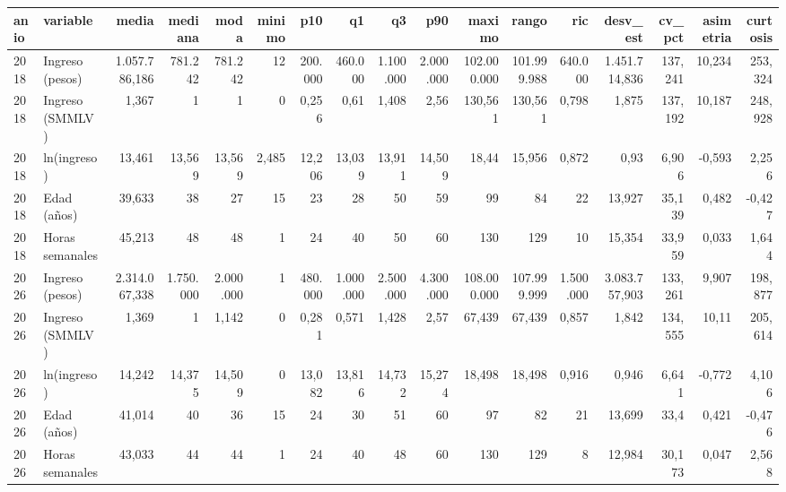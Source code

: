 \begin{tabular}{llrrrrrrrrrrrrrrr}
\toprule
anio & variable & media & mediana & moda & minimo & p10 & q1 & q3 & p90 & maximo & rango & ric & desv\_est & cv\_pct & asimetria & curtosis \\
\midrule
2018 & Ingreso (pesos) & 1.057.786,186 & 781.242 & 781.242 & 12 & 200.000 & 460.000 & 1.100.000 & 2.000.000 & 102.000.000 & 101.999.988 & 640.000 & 1.451.714,836 & 137,241 & 10,234 & 253,324 \\
2018 & Ingreso (SMMLV) & 1,367 & 1 & 1 & 0 & 0,256 & 0,61 & 1,408 & 2,56 & 130,561 & 130,561 & 0,798 & 1,875 & 137,192 & 10,187 & 248,928 \\
2018 & ln(ingreso) & 13,461 & 13,569 & 13,569 & 2,485 & 12,206 & 13,039 & 13,911 & 14,509 & 18,44 & 15,956 & 0,872 & 0,93 & 6,906 & -0,593 & 2,256 \\
2018 & Edad (años) & 39,633 & 38 & 27 & 15 & 23 & 28 & 50 & 59 & 99 & 84 & 22 & 13,927 & 35,139 & 0,482 & -0,427 \\
2018 & Horas semanales & 45,213 & 48 & 48 & 1 & 24 & 40 & 50 & 60 & 130 & 129 & 10 & 15,354 & 33,959 & 0,033 & 1,644 \\
2026 & Ingreso (pesos) & 2.314.067,338 & 1.750.000 & 2.000.000 & 1 & 480.000 & 1.000.000 & 2.500.000 & 4.300.000 & 108.000.000 & 107.999.999 & 1.500.000 & 3.083.757,903 & 133,261 & 9,907 & 198,877 \\
2026 & Ingreso (SMMLV) & 1,369 & 1 & 1,142 & 0 & 0,281 & 0,571 & 1,428 & 2,57 & 67,439 & 67,439 & 0,857 & 1,842 & 134,555 & 10,11 & 205,614 \\
2026 & ln(ingreso) & 14,242 & 14,375 & 14,509 & 0 & 13,082 & 13,816 & 14,732 & 15,274 & 18,498 & 18,498 & 0,916 & 0,946 & 6,641 & -0,772 & 4,106 \\
2026 & Edad (años) & 41,014 & 40 & 36 & 15 & 24 & 30 & 51 & 60 & 97 & 82 & 21 & 13,699 & 33,4 & 0,421 & -0,476 \\
2026 & Horas semanales & 43,033 & 44 & 44 & 1 & 24 & 40 & 48 & 60 & 130 & 129 & 8 & 12,984 & 30,173 & 0,047 & 2,568 \\
\bottomrule
\end{tabular}
